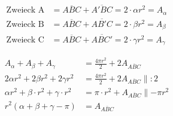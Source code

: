\begin{refsection}
\begin{align*}
\text{Zweieck A}
&=
\overline{ABC} + \overline{A'BC} = 2\cdot \alpha r^{ 2 } = A_{ \alpha }\\
\text{Zweieck B}
&=
\overline{ABC} + \overline{AB'C} = 2\cdot \beta r^{ 2 } = A_{ \beta }\\
\text{Zweieck C}
&=
\overline{ABC} + \overline{ABC'} = 2\cdot \gamma r^{ 2 } = A_{ \gamma }
\end{align*}

\begin{align*}
A_{ \alpha } + A_{ \beta } + A_{ \gamma } &= \frac{ 4\pi r^{ 2 } }{ 2 } + 2A_{ \overline{ ABC }} \\
2\alpha r^{ 2 } + 2\beta r^{ 2 } + 2\gamma r^{ 2 } &= \frac{ 4\pi r^{ 2 } }{ 2 } + 2A_{ \overline{ ABC }} \parallel:2\\
\alpha r^{ 2 } + \beta \cdot r^{ 2 } + \gamma \cdot r^{ 2 } &= \pi \cdot r^{ 2 } + A_{ \overline{ ABC }} \parallel-\pi r^{ 2 }\\
r^{ 2 }\left(\alpha + \beta + \gamma - \pi\right) &= A_{ \overline{ ABC }}
\end{align*}





\printbibliography[heading=subbibliography]
\end{refsection}



